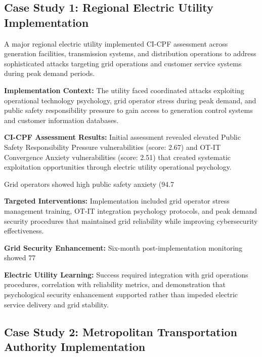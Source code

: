 \documentclass[10pt, twocolumn]{article}
\begin{document}
\subsection{Case Study 1: Regional Electric Utility Implementation}

A major regional electric utility implemented CI-CPF assessment across generation facilities, transmission systems, and distribution operations to address sophisticated attacks targeting grid operations and customer service systems during peak demand periods.

\textbf{Implementation Context:} The utility faced coordinated attacks exploiting operational technology psychology, grid operator stress during peak demand, and public safety responsibility pressure to gain access to generation control systems and customer information databases.

\textbf{CI-CPF Assessment Results:} Initial assessment revealed elevated Public Safety Responsibility Pressure vulnerabilities (score: 2.67) and OT-IT Convergence Anxiety vulnerabilities (score: 2.51) that created systematic exploitation opportunities through electric utility operational psychology.

Grid operators showed high public safety anxiety (94.7%

\textbf{Targeted Interventions:} Implementation included grid operator stress management training, OT-IT integration psychology protocols, and peak demand security procedures that maintained grid reliability while improving cybersecurity effectiveness.

\textbf{Grid Security Enhancement:} Six-month post-implementation monitoring showed 77%

\textbf{Electric Utility Learning:} Success required integration with grid operations procedures, correlation with reliability metrics, and demonstration that psychological security enhancement supported rather than impeded electric service delivery and grid stability.

\subsection{Case Study 2: Metropolitan Transportation Authority Implementation}
\end{document}

